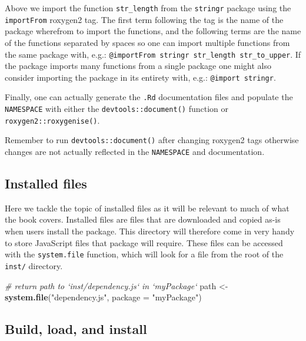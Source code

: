 \documentclass[10pt,]{krantz}
\makeatletter
\newenvironment{Shaded}{\begin{snugshade}}{\end{snugshade}}
\newcommand{\CommentTok}[1]{\textcolor[rgb]{0.37,0.37,0.37}{\textit{#1}}}
\newcommand{\DataTypeTok}[1]{\textcolor[rgb]{0.27,0.27,0.27}{#1}}
\newcommand{\KeywordTok}[1]{\textcolor[rgb]{0.27,0.27,0.27}{\textbf{#1}}}
\newcommand{\NormalTok}[1]{#1}
\newcommand{\StringTok}[1]{\textcolor[rgb]{0.5,0.5,0.5}{#1}}
\newenvironment{kframe}{%
\medskip{}
\setlength{\fboxsep}{.8em}
 \def\at@end@of@kframe{}%
 \ifinner\ifhmode%
  \def\at@end@of@kframe{\end{minipage}}%
  \begin{minipage}{\columnwidth}%
 \fi\fi%
 \def\FrameCommand##1{\hskip\@totalleftmargin \hskip-\fboxsep
 \colorbox{shadecolor}{##1}\hskip-\fboxsep
     \hskip-\linewidth \hskip-\@totalleftmargin \hskip\columnwidth}%
 \MakeFramed {\advance\hsize-\width
   \@totalleftmargin\z@ \linewidth\hsize
   \@setminipage}}%
 {\par\unskip\endMakeFramed%
 \at@end@of@kframe}
\renewenvironment{Shaded}{\begin{kframe}}{\end{kframe}}
\newenvironment{rmdblock}[1]
  {
  \begin{itemize}
  \renewcommand{\labelitemi}{
    \raisebox{-.7\height}[0pt][0pt]{
      {\setkeys{Gin}{width=3em,keepaspectratio}\texttt{[image: images/\#1]}}
    }
  }
  \setlength{\fboxsep}{1em}
  \begin{kframe}
  \item
  }
  {
  \end{kframe}
  \end{itemize}
  }
\newenvironment{rmdnote}
  {\begin{rmdblock}{note}}
  {\end{rmdblock}}
\makeatother
\begin{document}
Above we import the function \texttt{str\_length} from the \texttt{stringr} package using the \texttt{importFrom} roxygen2 tag. The first term following the tag is the name of the package wherefrom to import the functions, and the following terms are the name of the functions separated by spaces so one can import multiple functions from the same package with, e.g.: \texttt{@importFrom\ stringr\ str\_length\ str\_to\_upper}. If the package imports many functions from a single package one might also consider importing the package in its entirety with, e.g.: \texttt{@import\ stringr}.

Finally, one can actually generate the \texttt{.Rd} documentation files and populate the \texttt{NAMESPACE} with either the \texttt{devtools::document()} function or \texttt{roxygen2::roxygenise()}.

\begin{rmdnote}
Remember to run \texttt{devtools::document()} after changing roxygen2
tags otherwise changes are not actually reflected in the
\texttt{NAMESPACE} and documentation.
\end{rmdnote}

\hypertarget{basics-installed-files}{%
\subsection{Installed files}\label{basics-installed-files}}

Here we tackle the topic of installed files as it will be relevant to much of what the book covers. Installed files are files that are downloaded and copied as-is when users install the package. This directory will therefore come in very handy to store JavaScript files that package will require. These files can be accessed with the \texttt{system.file} function, which will look for a file from the root of the \texttt{inst/} directory.

\begin{Shaded}
\begin{Highlighting}[]
\CommentTok{# return path to `inst/dependency.js` in `myPackage`}
\NormalTok{path <-}\StringTok{ }\KeywordTok{system.file}\NormalTok{(}\StringTok{"dependency.js"}\NormalTok{, }\DataTypeTok{package =} \StringTok{"myPackage"}\NormalTok{)}
\end{Highlighting}
\end{Shaded}

\hypertarget{basics-build-load-install}{%
\subsection{Build, load, and install}\label{basics-build-load-install}}
\end{document}
